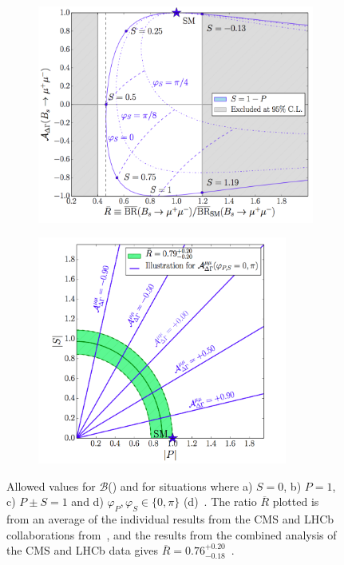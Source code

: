 \begin{figure}
\begin{subfigure}[b]{0.48\textwidth}
    \includegraphics[width=\textwidth]{./Figs/Theory/NP_P_pm_S_1.png}
    \caption{}
    \label{fig:Minnion}
  \end{subfigure}
  \begin{subfigure}[b]{0.48\textwidth}
  \centering

    \includegraphics[width=0.9\textwidth]{./Figs/Theory/NP_phi.png}
    \caption{}
    \label{fig:Minn}
  \end{subfigure}
  \caption{Allowed values for $\mathcal{B}$(\bsmumu) and \ADG for situations where a) $S=0$, b) $P=1$, c) $P \pm S = 1$ and d) $\varphi_P, \varphi_S \in \{0, \pi\}$ (d)~\cite{Buras:2013uqa,Knegjens:2014zva}. The ratio $\overline{R}$ plotted is from an average of the individual results from the CMS and LHCb collaborations from~\cite{CMSandLHCbCollaborations:2013pla}, and the results from the combined analysis of the CMS and LHCb data gives $\overline{R} = 0.76^{+0.20}_{-0.18}$~\cite{CMS:2014xfa}.}
  \label{fig:NPmodelsB}
\end{figure}




